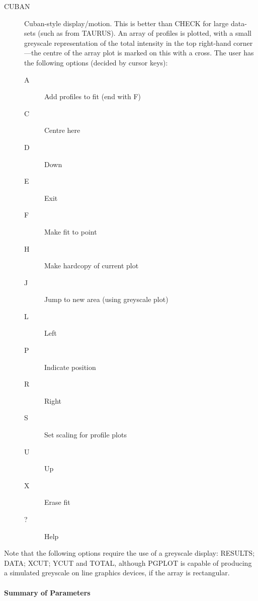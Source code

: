 \documentclass[11pt,twoside]{article}
\begin{document}
\begin{description}
\item[CUBAN] Cuban-style display/motion.
This is better than CHECK for large data-sets (such as from TAURUS).
An array of profiles is plotted, with a small greyscale representation
of the total intensity in the top right-hand corner---the centre of the
array plot is marked on this with a cross.
The user has the following options (decided by cursor keys):
\begin{description}
\item[A] Add profiles to fit (end with F)
\item[C] Centre here
\item[D] Down
\item[E] Exit
\item[F] Make fit to point
\item[H] Make hardcopy of current plot
\item[J] Jump to new area (using greyscale plot)
\item[L] Left
\item[P] Indicate position
\item[R] Right
\item[S] Set scaling for profile plots
\item[U] Up
\item[X] Erase fit
\item[?] Help
\end{description}
\end{description}
Note that the following options require the use of a greyscale display:
RESULTS; DATA; XCUT; YCUT and TOTAL, although PGPLOT is capable of
producing a simulated greyscale on line graphics devices, if the array
is rectangular.

\paragraph{Summary of Parameters}
\end{document}
